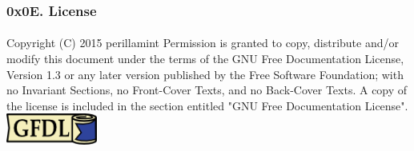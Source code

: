 \documentclass {beamer}
\begin{document}
\begin{frame}
  \frametitle{0x0E. License}
  \framesubtitle{}
  Copyright (C)  2015 perillamint\linebreak
  Permission is granted to copy, distribute and/or modify this document
  under the terms of the GNU Free Documentation License, Version 1.3
  or any later version published by the Free Software Foundation;\linebreak
  with no Invariant Sections, no Front-Cover Texts, and no Back-Cover Texts.
  A copy of the license is included in the section entitled "GNU
  Free Documentation License".
  \linebreak
  \linebreak
  \includegraphics [width=30mm]{img/gfdl-logo-small.png}
\end{frame}
\end{document}
